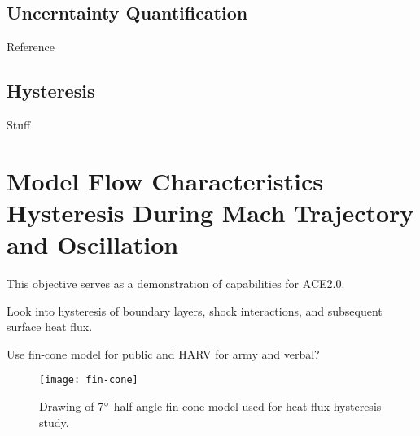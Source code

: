 \subsection{Uncerntainty Quantification}

Reference \cite{stephens-hubbard}

\subsection{Hysteresis}

Stuff

\section{Model Flow Characteristics Hysteresis During Mach Trajectory and Oscillation}

This objective serves as a demonstration of capabilities for ACE2.0. 

Look into hysteresis of boundary layers, shock interactions, and subsequent surface heat flux. 

Use fin-cone model for public and HARV for army and verbal?

\begin{figure}[ht]
    \centering
    \texttt{[image: fin-cone]}
    \caption{Drawing of 7$\degree$ half-angle fin-cone model used for heat flux hysteresis study.}
    \label{fig:fin-cone}
\end{figure}

